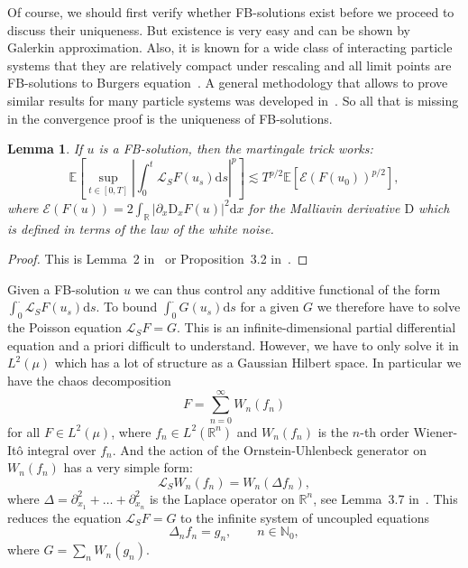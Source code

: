 \documentclass[a4paper,11pt]{article}
\newcommand{\cdummy}{\cdot}
\newcommand{\mathD}{\mathrm{D}}
\newcommand{\mathd}{\mathrm{d}}
\newtheorem{lemma}[theorem]{Lemma}
\newcommand{\1}{\mathds{1}}
\begin{document}
Of course, we should first verify whether FB-solutions exist before we proceed to discuss their uniqueness. But existence is very easy and can be shown by Galerkin approximation. Also, it is known for a wide class of interacting particle systems that they are relatively compact under rescaling and all limit points are FB-solutions to Burgers equation~\cite{GJ14, GJS15, DGP16}. A general methodology that allows to prove similar results for many particle systems was developed in~\cite{GJ14}. So all that is missing in the convergence proof is the uniqueness of FB-solutions.

\begin{lemma}
  If $u$ is a FB-solution, then the martingale trick works:
  \[ \mathbb{E} \left[ \sup_{t \in [0, T]} \left| \int_0^t \mathcal{L}_S F
     (u_s) \mathd s \right|^p \right] \lesssim T^{p / 2} \mathbb{E}
     [\mathcal{E} (F (u_0))^{p / 2}], \]
  where $\mathcal{E} (F (u)) = 2 \int_{\mathbb{R}} | \partial_x \mathD_x F (u) |^2 \mathd x$ for the Malliavin derivative $\mathD$ which is defined in terms of the law of the white noise.
\end{lemma}

\begin{proof}
  This is Lemma~2 in~\cite{GJ13} or Proposition~3.2 in~{\cite{GP16}}.
\end{proof}

Given a FB-solution $u$ we can thus control any additive functional of the form $\int_0^{\cdummy}
\mathcal{L}_S F (u_s) \mathd s$. To bound $\int_0^{\cdummy} G (u_s) \mathd s$
for a given $G$ we therefore have to solve the Poisson equation $\mathcal{L}_S
F = G$. This is an infinite-dimensional partial differential equation and a
priori difficult to understand. However, we have to only solve it in $L^2
(\mu)$ which has a lot of structure as a Gaussian Hilbert space. In particular
we have the chaos decomposition
\[ F = \sum_{n = 0}^{\infty} W_n (f_n) \]
for all $F \in L^2 (\mu)$, where $f_n \in L^2 (\mathbb{R}^n)$ and $W_n (f_n)$
is the $n$-th order Wiener-It{\^o} integral over $f_n$. And the
action of the Ornstein-Uhlenbeck generator  on $W_n (f_n)$ has
a very simple form:
\[ \mathcal{L}_S W_n (f_n) = W_n (\Delta f_n), \]
where $\Delta = \partial_{x_1}^2 + \ldots + \partial_{x_n}^2$ is the Laplace
operator on $\mathbb{R}^n$, see Lemma~3.7 in~{\cite{GP16}}. This
reduces the equation $\mathcal{L}_S F = G$ to the infinite system of uncoupled
equations
\[ \Delta_n f_n = g_n, \qquad n \in \mathbb{N}_0, \]
where $G = \sum_n W_n (g_n)$.
\end{document}
